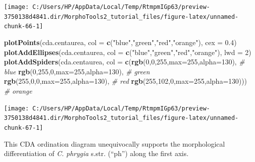 \documentclass[
]{article}
\newenvironment{Shaded}{\begin{snugshade}}{\end{snugshade}}
\newcommand{\CommentTok}[1]{\textcolor[rgb]{0.56,0.35,0.01}{\textit{#1}}}
\newcommand{\DataTypeTok}[1]{\textcolor[rgb]{0.13,0.29,0.53}{#1}}
\newcommand{\DecValTok}[1]{\textcolor[rgb]{0.00,0.00,0.81}{#1}}
\newcommand{\FloatTok}[1]{\textcolor[rgb]{0.00,0.00,0.81}{#1}}
\newcommand{\KeywordTok}[1]{\textcolor[rgb]{0.13,0.29,0.53}{\textbf{#1}}}
\newcommand{\NormalTok}[1]{#1}
\newcommand{\StringTok}[1]{\textcolor[rgb]{0.31,0.60,0.02}{#1}}
\begin{document}
\begin{center}\texttt{[image: C:/Users/HP/AppData/Local/Temp/RtmpmIGp63/preview-3750138d4841.dir/MorphoTools2\_tutorial\_files/figure-latex/unnamed-chunk-66-1]} \end{center}

\begin{Shaded}
\begin{Highlighting}[]
\KeywordTok{plotPoints}\NormalTok{(cda.centaurea, }\DataTypeTok{col =} \KeywordTok{c}\NormalTok{(}\StringTok{"blue"}\NormalTok{,}\StringTok{"green"}\NormalTok{,}\StringTok{"red"}\NormalTok{,}\StringTok{"orange"}\NormalTok{), }\DataTypeTok{cex =} \FloatTok{0.4}\NormalTok{)}
\KeywordTok{plotAddEllipses}\NormalTok{(cda.centaurea, }\DataTypeTok{col =} \KeywordTok{c}\NormalTok{(}\StringTok{"blue"}\NormalTok{,}\StringTok{"green"}\NormalTok{,}\StringTok{"red"}\NormalTok{,}\StringTok{"orange"}\NormalTok{), }\DataTypeTok{lwd =} \DecValTok{2}\NormalTok{)}
\KeywordTok{plotAddSpiders}\NormalTok{(cda.centaurea, }\DataTypeTok{col =} \KeywordTok{c}\NormalTok{(}\KeywordTok{rgb}\NormalTok{(}\DecValTok{0}\NormalTok{,}\DecValTok{0}\NormalTok{,}\DecValTok{255}\NormalTok{,}\DataTypeTok{max=}\DecValTok{255}\NormalTok{,}\DataTypeTok{alpha=}\DecValTok{130}\NormalTok{), }\CommentTok{# blue}
                                      \KeywordTok{rgb}\NormalTok{(}\DecValTok{0}\NormalTok{,}\DecValTok{255}\NormalTok{,}\DecValTok{0}\NormalTok{,}\DataTypeTok{max=}\DecValTok{255}\NormalTok{,}\DataTypeTok{alpha=}\DecValTok{130}\NormalTok{), }\CommentTok{# green}
                                      \KeywordTok{rgb}\NormalTok{(}\DecValTok{255}\NormalTok{,}\DecValTok{0}\NormalTok{,}\DecValTok{0}\NormalTok{,}\DataTypeTok{max=}\DecValTok{255}\NormalTok{,}\DataTypeTok{alpha=}\DecValTok{130}\NormalTok{), }\CommentTok{# red}
                                      \KeywordTok{rgb}\NormalTok{(}\DecValTok{255}\NormalTok{,}\DecValTok{102}\NormalTok{,}\DecValTok{0}\NormalTok{,}\DataTypeTok{max=}\DecValTok{255}\NormalTok{,}\DataTypeTok{alpha=}\DecValTok{130}\NormalTok{))) }\CommentTok{# orange}
\end{Highlighting}
\end{Shaded}

\begin{center}\texttt{[image: C:/Users/HP/AppData/Local/Temp/RtmpmIGp63/preview-3750138d4841.dir/MorphoTools2\_tutorial\_files/figure-latex/unnamed-chunk-67-1]} \end{center}

This CDA ordination diagram unequivocally supports the morphological
differentiation of \emph{C. phrygia} s.str. (``ph'') along the first
axis.
\end{document}
